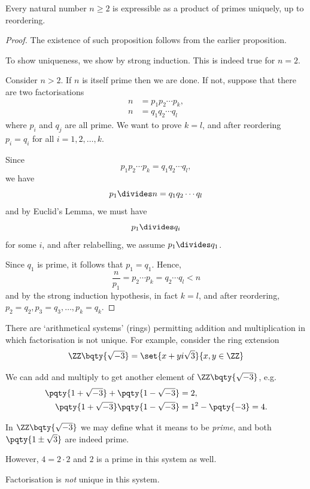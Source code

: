 \begin{theorem}
    Every natural number \(n \geq 2\) is expressible as a product of primes uniquely, up to reordering. 
\end{theorem}

\begin{proof}
    The existence of such proposition follows from the earlier proposition.

    To show uniqueness, we show by strong induction. This is indeed true for \(n = 2\).

    Consider \(n > 2\). If \(n\) is itself prime then we are done. If not, suppose that there are two factorisations
    \begin{align*}
        n &= p_1 p_2 \cdots p_k,\\
        n &= q_1 q_2 \cdots q_l
    \end{align*}
    where \(p_i\) and \(q_j\) are all prime. We want to prove \(k = l\), and after reordering \(p_i = q_i\) for all \(i = 1, 2, \ldots, k\).

    Since
    \[
        p_1 p_2 \cdots p_k = q_1 q_2 \cdots q_l,
    \]
    we have
    \[
        p_1 \divides n = q_1 q_2 \cdots q_l
    \]
    and by Euclid's Lemma, we must have
    \[
        p_1 \divides q_i
    \]
    for some \(i\), and after relabelling, we assume \(p_1 \divides q_1\).

    Since \(q_1\) is prime, it follows that \(p_1 = q_1\). Hence,
    \[
        \frac{n}{p_1} = p_2 \cdots p_k = q_2 \cdots q_l < n
    \]
    and by the strong induction hypothesis, in fact \(k = l\), and after reordering, \(p_2 = q_2, p_3 = q_3, \ldots, p_k = q_k\).
\end{proof}

\begin{remark}
    There are `arithmetical systems' (rings) permitting addition and multiplication in which factorisation is not unique. For example, consider the ring extension
    \[
        \ZZ\bqty{\sqrt{-3}} = \set{x + y i \sqrt{3}}{x, y \in \ZZ}
    \]

    We can add and multiply to get another element of \(\ZZ\bqty{\sqrt{-3}}\), e.g.
    \begin{align*}
        \pqty{1 + \sqrt{-3}} + \pqty{1 - \sqrt{-3}} &= 2,\\
        \pqty{1 + \sqrt{-3}} \pqty{1 - \sqrt{-3}} &= 1^2 - \pqty{-3} = 4.
    \end{align*}

    In \(\ZZ\bqty{\sqrt{-3}}\) we may define what it means to be \emph{prime}, and both \(\pqty{1 \pm \sqrt{3}}\) are indeed prime.

    However, \(4 = 2 \cdot 2\) and \(2\) is a prime in this system as well.

    Factorisation is \emph{not} unique in this system.
\end{remark}

